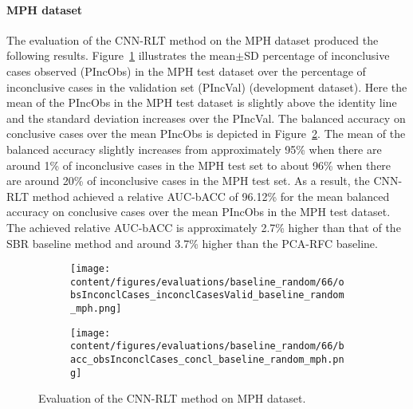 \paragraph{MPH dataset}

The evaluation of the CNN-RLT method on the MPH dataset produced the following results.
Figure~\ref{fig:obsInconclCases_inconclCasesValid_baseline_random_mph} illustrates
the mean$\pm$SD percentage of inconclusive cases observed (PIncObs) in the MPH test dataset 
over the percentage of inconclusive cases in the validation set (PIncVal) (development dataset).
Here the mean of the PIncObs in the MPH test dataset is slightly above the identity line 
and the standard deviation increases over the PIncVal.
The balanced accuracy on conclusive cases over the mean PIncObs is depicted 
in Figure~\ref{fig:bacc_obsInconclCases_concl_baseline_random_mph}.
The mean of the balanced accuracy slightly increases from approximately 95\% 
when there are around 1\% of inconclusive cases in the MPH test set to about 96\% 
when there are around 20\% of inconclusive cases in the MPH test set.
As a result, the CNN-RLT method achieved a relative AUC-bACC of 96.12\% for the mean balanced accuracy on conclusive cases 
over the mean PIncObs in the MPH test dataset.
The achieved relative AUC-bACC is approximately 2.7\% higher than that of the SBR baseline method 
and around 3.7\% higher than the PCA-RFC baseline.


\begin{figure}[ht]
  \begin{subfigure}{0.49\textwidth}
    \centering
    \texttt{[image: content/figures/evaluations/baseline\_random/66/obsInconclCases\_inconclCasesValid\_baseline\_random\_mph.png]}
    \label{fig:obsInconclCases_inconclCasesValid_baseline_random_mph}
  \end{subfigure}
  \hfill
  \begin{subfigure}{0.49\textwidth}
    \centering
    \texttt{[image: content/figures/evaluations/baseline\_random/66/bacc\_obsInconclCases\_concl\_baseline\_random\_mph.png]}
    \label{fig:bacc_obsInconclCases_concl_baseline_random_mph}
  \end{subfigure}
  \caption{Evaluation of the CNN-RLT method on MPH dataset.}
  \label{fig:perf_eval_rlt_mph}
\end{figure}


